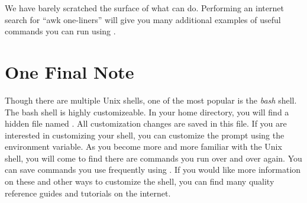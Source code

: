We have barely scratched the surface of what  can do. Performing an internet search for ``awk one-liners'' will give you many additional examples of useful commands you can run using . 

\section*{One Final Note}
Though there are multiple Unix shells, one of the most popular is the \emph{bash} shell. The bash shell is highly customizeable. In your home directory, you will find a hidden file named . All customization changes are saved in this file. If you are interested in customizing your shell, you can customize the prompt using the  environment variable.
As you become more and more familiar with the Unix shell, you will come to find there are commands you run over and over again. You can save commands you use frequently using . If you would like more information on these and other ways to customize the shell, you can find many quality reference guides and tutorials on the internet.

 
